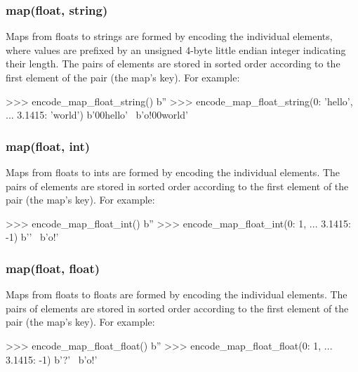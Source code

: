 \subsubsection{map(float, string)}

Maps from floats to strings are formed by encoding the individual elements,
where values are prefixed by an unsigned 4-byte little endian integer indicating
their length.  The pairs of elements are stored in sorted order according to the
first element of the pair (the map's key).  For example:

\begin{pythoncode}
>>> encode_map_float_string({})
b''
>>> encode_map_float_string({0: 'hello',
...                          3.1415: 'world'})
b'\x00hello' \
b'o\xca!\t@{}\x00world'
\end{pythoncode}

\subsubsection{map(float, int)}

Maps from floats to ints are formed by encoding the individual elements.  The
pairs of elements are stored in sorted order according to the first element of
the pair (the map's key).  For example:

\begin{pythoncode}
>>> encode_map_float_int({})
b''
>>> encode_map_float_int({0: 1,
...                       3.1415: -1})
b'\x00\x00\x00\x00\x00\x00\x00' \
b'o\xca!\t@\xff\xff\xff\xff\xff\xff\xff\xff'
\end{pythoncode}

\subsubsection{map(float, float)}

Maps from floats to floats are formed by encoding the individual elements.  The
pairs of elements are stored in sorted order according to the first element of
the pair (the map's key).  For example:

\begin{pythoncode}
>>> encode_map_float_float({})
b''
>>> encode_map_float_float({0: 1,
...                         3.1415: -1})
b'\x00\x00\x00\x00\x00\x00\x00?' \
b'o\xca!\t@{}\xbf'
\end{pythoncode}

